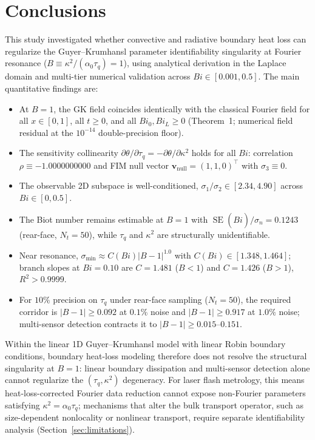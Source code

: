\documentclass[preprint,12pt]{elsarticle}
\begin{document}
\section{Conclusions}

This study investigated whether convective and radiative boundary heat loss can regularize the Guyer--Krumhansl parameter identifiability singularity at Fourier resonance ($B \equiv \kappa^2 / (\alpha_0 \tau_q) = 1$), using analytical derivation in the Laplace domain and multi-tier numerical validation across $Bi \in [0.001, 0.5]$. The main quantitative findings are:

\begin{itemize}
    \item At $B = 1$, the GK field coincides identically with the classical Fourier field for all $x \in [0, 1]$, all $t \ge 0$, and all $Bi_0, Bi_L \ge 0$ (Theorem~1; numerical field residual at the $10^{-14}$ double-precision floor).
    \item The sensitivity collinearity $\partial \theta / \partial \tau_q = -\partial \theta / \partial \kappa^2$ holds for all $Bi$: correlation $\rho \equiv -1.0000000000$ and FIM null vector $\bm{v}_{\mathrm{null}} = (1, 1, 0)^\top$ with $\sigma_3 \equiv 0$.
    \item The observable 2D subspace is well-conditioned, $\sigma_1 / \sigma_2 \in [2.34, 4.90]$ across $Bi \in [0, 0.5]$.
    \item The Biot number remains estimable at $B = 1$ with $\operatorname{SE}(\hat{Bi})/\sigma_n = 0.1243$ (rear-face, $N_t = 50$), while $\tau_q$ and $\kappa^2$ are structurally unidentifiable.
    \item Near resonance, $\sigma_{\min} \approx C(Bi)|B-1|^{1.0}$ with $C(Bi) \in [1.348, 1.464]$; branch slopes at $Bi = 0.10$ are $C = 1.481$ ($B<1$) and $C = 1.426$ ($B>1$), $R^2 > 0.9999$.
    \item For $10\%$ precision on $\tau_q$ under rear-face sampling ($N_t = 50$), the required corridor is $|B-1| \ge 0.092$ at $0.1\%$ noise and $|B-1| \ge 0.917$ at $1.0\%$ noise; multi-sensor detection contracts it to $|B-1| \ge 0.015$--$0.151$.
\end{itemize}

Within the linear 1D Guyer--Krumhansl model with linear Robin boundary conditions, boundary heat-loss modeling therefore does not resolve the structural singularity at $B = 1$: linear boundary dissipation and multi-sensor detection alone cannot regularize the $(\tau_q, \kappa^2)$ degeneracy. For laser flash metrology, this means heat-loss-corrected Fourier data reduction cannot expose non-Fourier parameters satisfying $\kappa^2 = \alpha_0 \tau_q$; mechanisms that alter the bulk transport operator, such as size-dependent nonlocality or nonlinear transport, require separate identifiability analysis (Section~\ref{sec:limitations}).
\end{document}
